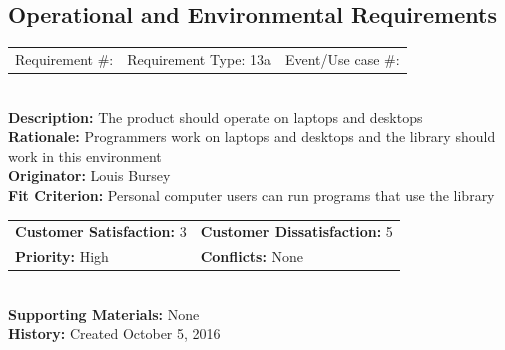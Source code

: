\documentclass[12pt, titlepage]{article}
\begin{document}
\subsection{Operational and Environmental Requirements}

%
%
\begin{reqbox}
\begin{tabular}{ccc}
Requirement \#: & Requirement Type: 13a & Event/Use case \#: \\
\end{tabular} \\
\textbf{Description:} The product should operate on laptops and desktops \\
\textbf{Rationale:} Programmers work on laptops and desktops and the library should work in this environment \\
\textbf{Originator:} Louis Bursey\\
\textbf{Fit Criterion:}  Personal computer users can run programs that use the library\\
\begin{tabular}{ll}
\textbf{Customer Satisfaction:} 3 & \textbf{Customer Dissatisfaction:} 5 \\
\textbf{Priority:} High & \textbf{Conflicts:} None\\
\end{tabular} \\
\textbf{Supporting Materials:} None \\
\textbf{History:} Created October 5, 2016
\end{reqbox}
\end{document}
